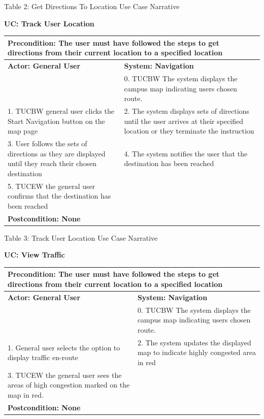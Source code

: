 \documentclass{article}
\begin{document}
{\begin{flushleft}
\begin{tabular}{  |p{7cm}|p{7cm}| }
\end{tabular}
\end{flushleft}
\begin{center}
    	Table 2: Get Directions To Location Use Case Narrative
\end{center}
\noindent\textbf{UC: Track User Location}
\begin{flushleft}
\begin{tabular}{ |p{7cm}|p{7cm}| }
  \hline
  \multicolumn{2}{|p{\textwidth}|}{\textbf{Precondition:} The user must have followed the steps to get directions from their current location to a specified location} \\
  \hline
  \textbf{Actor: General User}  & \textbf{System: Navigation} \\
   \hline
   & 0. TUCBW The system displays the campus map indicating users chosen route. \\
  \hline
  1. TUCBW general user clicks the Start Navigation button on the map page& 2. The system displays sets of directions until the user arrives at their specified location or they terminate the instruction\\
  \hline
  3. User follows the sets of directions as they are displayed until they reach their chosen destination& 4. The system notifies the user that the destination has been reached\\
  \hline
  5. TUCEW the general user confirms that the destination has been reached& \\
  \hline
  \multicolumn{2}{|p{\textwidth}|}{\textbf{Postcondition: None}} \\
   \hline
\end{tabular}
\end{flushleft}
\begin{center}
    	Table 3: Track User Location Use Case Narrative
\end{center}
\bigskip
\bigskip

\noindent\textbf{UC: View Traffic}
\begin{flushleft}
\begin{tabular}{ |p{7cm}|p{7cm}| }
  \hline
  \multicolumn{2}{|p{\textwidth}|}{\textbf{Precondition:} The user must have followed the steps to get directions from their current location to a specified location} \\
  \hline
  \textbf{Actor: General User}  & \textbf{System: Navigation} \\
   \hline
   & 0. TUCBW The system displays the campus map indicating users chosen route. \\
  \hline
  1. General user selects the option to display traffic en-route & 2. The system updates the displayed map to indicate highly congested area in red\\
  \hline
  3. TUCEW the general user sees the areas of high congestion marked on the map in red.&\\
  \hline
  \multicolumn{2}{|p{\textwidth}|}{\textbf{Postcondition: None}} \\
   \hline
\end{tabular}
\end{flushleft}
}
\end{document}
